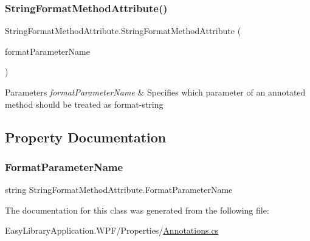 \subsubsection{\texorpdfstring{String\+Format\+Method\+Attribute()}{StringFormatMethodAttribute()}}
{\footnotesize\ttfamily String\+Format\+Method\+Attribute.\+String\+Format\+Method\+Attribute (\begin{DoxyParamCaption}\item[{\mbox{[}\+Not\+Null\mbox{]} string}]{format\+Parameter\+Name }\end{DoxyParamCaption})}


\begin{DoxyParams}{Parameters}
{\em format\+Parameter\+Name} & Specifies which parameter of an annotated method should be treated as format-\/string \\
\hline
\end{DoxyParams}


\subsection{Property Documentation}
\mbox{\label{class_string_format_method_attribute_a93e8904b7dfa6cdd20798a5ae4d3423e}} 
\subsubsection{\texorpdfstring{Format\+Parameter\+Name}{FormatParameterName}}
{\footnotesize\ttfamily string String\+Format\+Method\+Attribute.\+Format\+Parameter\+Name\hspace{0.3cm}{\ttfamily [get]}}



The documentation for this class was generated from the following file\+:\begin{DoxyCompactItemize}
\item 
Easy\+Library\+Application.\+W\+P\+F/\+Properties/\mbox{\hyperlink{_annotations_8cs}{Annotations.\+cs}}\end{DoxyCompactItemize}
